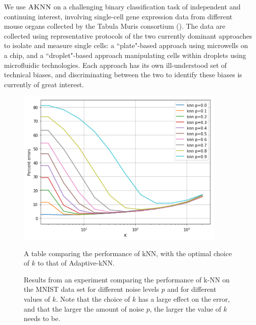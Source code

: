 \documentclass{article}
\newcommand{\algname}{\textsc{AKNN}}
\begin{document}
We use $\algname$ on a challenging binary classification task of independent and continuing interest, involving single-cell gene expression data from different mouse organs collected by the Tabula Muris consortium (\cite{tabulamuris18}). The data are collected using representative protocols of the two currently dominant approaches to isolate and measure single cells: a ``plate"-based approach using microwells on a chip, and a ``droplet"-based approach manipulating cells within droplets using microfluidic technologies. Each approach has its own ill-understood set of technical biases, and discriminating between the two to identify these biases is currently of great interest.

\begin{figure}
\begin{center}
\includegraphics[width=4in]{computing_NN-with_uniform_Noise_2.png}
\end{center}
\caption{Results from an experiment comparing the performance of k-NN on the MNIST data set for different noise levels $p$ and for different values of $k$. Note that the choice of $k$ has a large effect on the error, and that the larger the amount of noise $p$, the larger the value of $k$ needs to be.}
\label{fig:mnist}

A table comparing the performance of kNN, with the optimal choice of $k$ to that of Adaptive-kNN.


\end{figure}
\end{document}
